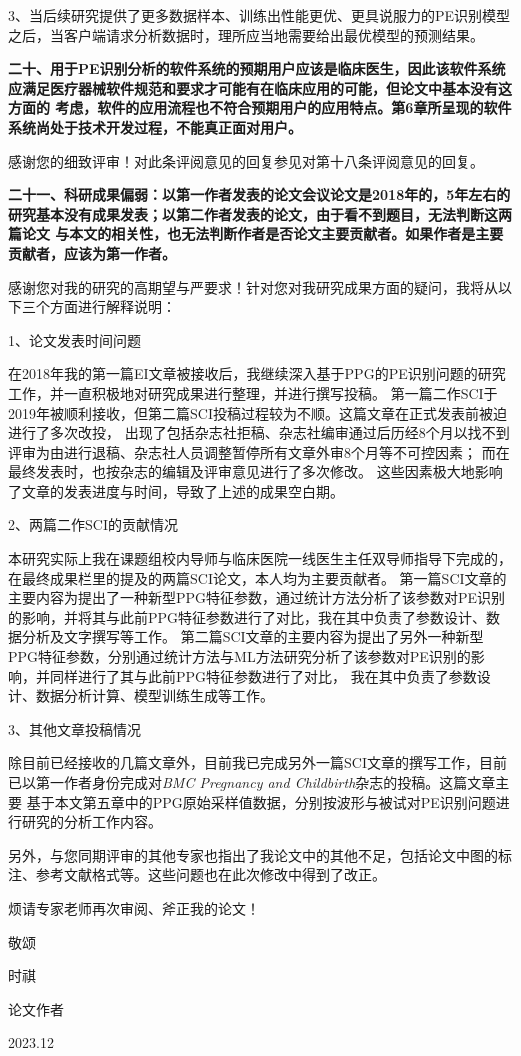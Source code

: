 3、当后续研究提供了更多数据样本、训练出性能更优、更具说服力的PE识别模型之后，当客户端请求分析数据时，理所应当地需要给出最优模型的预测结果。

\textbf{二十、用于PE识别分析的软件系统的预期用户应该是临床医生，因此该软件系统应满足医疗器械软件规范和要求才可能有在临床应用的可能，但论文中基本没有这方面的
考虑，软件的应用流程也不符合预期用户的应用特点。第6章所呈现的软件系统尚处于技术开发过程，不能真正面对用户。}

感谢您的细致评审！对此条评阅意见的回复参见对第十八条评阅意见的回复。

\textbf{二十一、科研成果偏弱：以第一作者发表的论文会议论文是2018年的，5年左右的研究基本没有成果发表；以第二作者发表的论文，由于看不到题目，无法判断这两篇论文
与本文的相关性，也无法判断作者是否论文主要贡献者。如果作者是主要贡献者，应该为第一作者。}

感谢您对我的研究的高期望与严要求！针对您对我研究成果方面的疑问，我将从以下三个方面进行解释说明：

1、论文发表时间问题

在2018年我的第一篇EI文章被接收后，我继续深入基于PPG的PE识别问题的研究工作，并一直积极地对研究成果进行整理，并进行撰写投稿。
第一篇二作SCI于2019年被顺利接收，但第二篇SCI投稿过程较为不顺。这篇文章在正式发表前被迫进行了多次改投，
出现了包括杂志社拒稿、杂志社编审通过后历经8个月以找不到评审为由进行退稿、杂志社人员调整暂停所有文章外审8个月等不可控因素；
而在最终发表时，也按杂志的编辑及评审意见进行了多次修改。
这些因素极大地影响了文章的发表进度与时间，导致了上述的成果空白期。

2、两篇二作SCI的贡献情况

本研究实际上我在课题组校内导师与临床医院一线医生主任双导师指导下完成的，在最终成果栏里的提及的两篇SCI论文，本人均为主要贡献者。
第一篇SCI文章的主要内容为提出了一种新型PPG特征参数，通过统计方法分析了该参数对PE识别的影响，并将其与此前PPG特征参数进行了对比，我在其中负责了参数设计、数据分析及文字撰写等工作。
第二篇SCI文章的主要内容为提出了另外一种新型PPG特征参数，分别通过统计方法与ML方法研究分析了该参数对PE识别的影响，并同样进行了其与此前PPG特征参数进行了对比，
我在其中负责了参数设计、数据分析计算、模型训练生成等工作。

3、其他文章投稿情况

除目前已经接收的几篇文章外，目前我已完成另外一篇SCI文章的撰写工作，目前已以第一作者身份完成对\textit{BMC Pregnancy and Childbirth}杂志的投稿。这篇文章主要
基于本文第五章中的PPG原始采样值数据，分别按波形与被试对PE识别问题进行研究的分析工作内容。

\bigskip
\bigskip
另外，与您同期评审的其他专家也指出了我论文中的其他不足，包括论文中图的标注、参考文献格式等。这些问题也在此次修改中得到了改正。

烦请专家老师再次审阅、斧正我的论文！

敬颂

\noindent
时祺

\begin{flushright}
论文作者

2023.12
\end{flushright}
